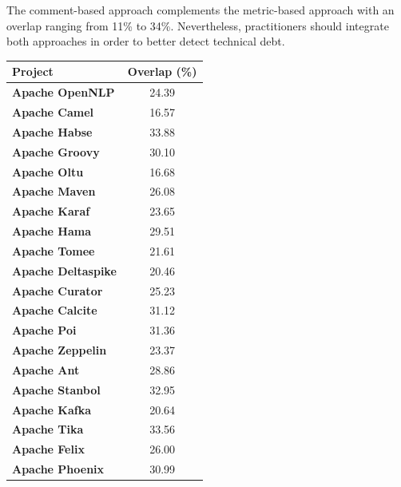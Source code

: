 {\begin{myboxii}
	The comment-based approach complements the metric-based approach with an overlap ranging from 11\% to 34\%. Nevertheless, practitioners should integrate both approaches in order to better detect technical debt.
\end{myboxii}

	\begin{table}[!htbp]
	\small
	\centering
	
	\begin{tabular}{l|c}
		\hline
		\textbf{Project}           & \textbf{Overlap (\%)} \\ \hline
		\textbf{Apache OpenNLP}    &    24.39     \\ \hline
		\textbf{Apache Camel}      &    16.57     \\ \hline
		\textbf{Apache Habse}      &    33.88     \\ \hline
		\textbf{Apache Groovy}     &    30.10     \\ \hline
		\textbf{Apache Oltu}       &    16.68     \\ \hline
		\textbf{Apache Maven}      &    26.08     \\ \hline
		\textbf{Apache Karaf}      &    23.65     \\ \hline
		\textbf{Apache Hama}       &    29.51     \\ \hline
		\textbf{Apache Tomee}      &    21.61     \\ \hline
		\textbf{Apache Deltaspike} &    20.46     \\ \hline
		\textbf{Apache Curator}    &    25.23     \\ \hline
		\textbf{Apache Calcite}    &    31.12     \\ \hline
		\textbf{Apache Poi}        &    31.36     \\ \hline
		\textbf{Apache Zeppelin}   &    23.37     \\ \hline
		\textbf{Apache Ant}        &    28.86     \\ \hline
		\textbf{Apache Stanbol}    &    32.95     \\ \hline
		\textbf{Apache Kafka}      &    20.64     \\ \hline
		\textbf{Apache Tika}       &    33.56     \\ \hline
		\textbf{Apache Felix}      &    26.00     \\ \hline
		\textbf{Apache Phoenix}    &    30.99     \\ \hline
	\end{tabular}

\end{table}}
